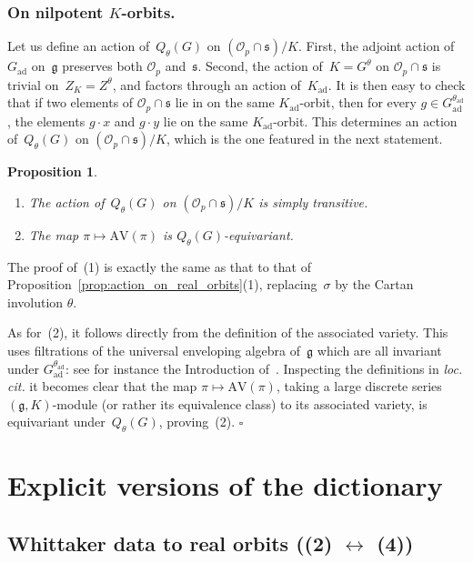 \documentclass[10pt,leqno]{article}
\newtheorem{proposition}[equation]{Proposition}
\newcommand{\qed}{\hfill $\square$ \medskip}
\newcommand{\ad}{\mathrm{ad}}
\newcommand{\Gad}{G_\mathrm{ad}}
\newcommand{\Kad}{K_\mathrm{ad}}
\renewcommand{\O}{\mathcal O}
\newcommand{\g}{\mathfrak g}
\newcommand{\s}{\mathfrak s}
\newcommand{\AV}{\mathrm{AV}}
\newcommand{\Op}{\O_p}
\begin{document}
\subsubsection*{On nilpotent $K$-orbits.} 



Let us define an action of~$Q_{\theta}(G)$ on $(\Op \cap \s)/K$. First, the adjoint action of~$\Gad$ on~$\g$ preserves both $\Op$ and~$\s$. Second, the action of~$K=G^\theta$ on $\Op \cap \s$ is trivial on~$Z_K=Z^\theta$, and factors through an action of~$\Kad$. It is then easy to check that if two elements of $\Op \cap \s$ lie in on the same $\Kad$-orbit, then for every $g \in \Gad^{\theta_{\ad}}$, the elements  ${g} \cdot x$ and ${g} \cdot y$ lie on the same $\Kad$-orbit. This determines an action of~$Q_\theta(G)$ on $(\Op \cap \s)/K$, which is the one featured in the next statement.

\begin{proposition}\label{prop:action_on_K_orbits}
\begin{enumerate} 
\item The action of~$Q_{\theta}(G)$ on $(\Op \cap \s)/K$ is simply transitive.
\item The map $\pi \mapsto \AV(\pi)$ is $Q_{\theta}(G)$-equivariant.
\end{enumerate}
\end{proposition}

The proof of~(1) is exactly the same as that  to that of Proposition~\ref{prop:action_on_real_orbits}(1), replacing~$\sigma$ by the Cartan involution $\theta$.

As for~(2), it follows directly from the definition of the associated variety. This uses filtrations of the universal enveloping algebra of~$\g$ which are all invariant under $\Gad^{\theta_{\ad}}$: see for instance the Introduction of~\cite{vogan_bowdoin}. Inspecting the definitions in \emph{loc. cit.} it becomes clear that the map $\pi \mapsto \AV(\pi)$, taking a large discrete series $(\g,K)$-module  (or rather its equivalence class) to its associated variety, is equivariant under~$Q_{\theta}(G)$, proving~(2). 
\qed


\section{Explicit versions of the dictionary}\label{sec:explicit}

\subsection{Whittaker data to real orbits ((2) $\leftrightarrow$ (4))}
\end{document}
